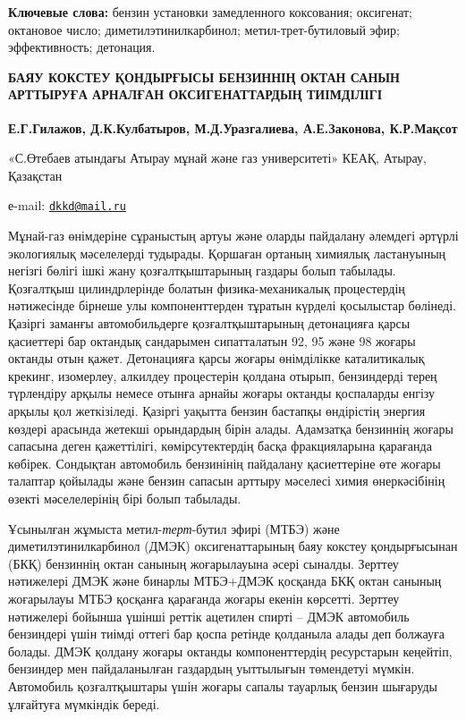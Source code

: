 {\bfseries Ключевые слова:} бензин установки замедленного коксования;
оксигенат; октановое число; диметилэтинилкарбинол; метил-трет-бутиловый
эфир; эффективность; детонация.

\begin{articleheader}
{\bfseries БАЯУ КОКСТЕУ ҚОНДЫРҒЫСЫ БЕНЗИННІҢ ОКТАН САНЫН АРТТЫРУҒА АРНАЛҒАН
ОКСИГЕНАТТАРДЫҢ ТИІМДІЛІГІ}

{\bfseries Е.Г.Гилажов, Д.К.Кулбатыров\textsuperscript{\envelope }, М.Д.Уразгалиева,
А.Е.Законова, К.Р.Мақсот}
\end{articleheader}

\begin{affiliation}
«С.Өтебаев атындағы Атырау мұнай және газ университеті» КЕАҚ, Атырау,
Қазақстан

е-mail: \href{mailto:dkkd@mail.ru}{\nolinkurl{dkkd@mail.ru}}
\end{affiliation}

Мұнай-газ өнімдеріне сұраныстың артуы және оларды пайдалану әлемдегі
әртүрлі экологиялық мәселелерді тудырады. Қоршаған ортаның химиялық
ластануының негізгі бөлігі ішкі жану қозғалтқыштарының газдары болып
табылады. Қозғалтқыш цилиндрлерінде болатын физика-механикалық
процестердің нәтижесінде бірнеше улы компоненттерден тұратын күрделі
қосылыстар бөлінеді. Қазіргі заманғы автомобильдерге қозғалтқыштарының
детонацияға қарсы қасиеттері бар октандық сандарымен сипатталатын 92, 95
және 98 жоғары октанды отын қажет. Детонацияға қарсы жоғары өнімділікке
каталитикалық крекинг, изомерлеу, алкилдеу процестерін қолдана отырып,
бензиндерді терең түрлендіру арқылы немесе отынға арнайы жоғары октанды
қоспаларды енгізу арқылы қол жеткізіледі. Қазіргі уақытта бензин
бастапқы өндірістің энергия көздері арасында жетекші орындардың бірін
алады. Адамзатқа бензиннің жоғары сапасына деген қажеттілігі,
көмірсутектердің басқа фракцияларына қарағанда көбірек. Сондықтан
автомобиль бензинінің пайдалану қасиеттеріне өте жоғары талаптар
қойылады және бензин сапасын арттыру мәселесі химия өнеркәсібінің өзекті
мәселелерінің бірі болып табылады.

Ұсынылған жұмыста метил-\emph{терт}-бутил эфирі (МТБЭ) және
диметилэтинилкарбинол (ДМЭК) оксигенаттарының баяу кокстеу қондырғысынан
(БКҚ) бензиннің октан санының жоғарылауына әсері сыналды. Зерттеу
нәтижелері ДМЭК және бинарлы МТБЭ+ДМЭК қосқанда БКҚ октан санының
жоғарылауы МТБЭ қосқанға қарағанда жоғары екенін көрсетті. Зерттеу
нәтижелері бойынша үшінші реттік ацетилен спирті -- ДМЭК автомобиль
бензиндері үшін тиімді оттегі бар қоспа ретінде қолданыла алады деп
болжауға болады. ДМЭК қолдану жоғары октанды компоненттердің ресурстарын
кеңейтіп, бензиндер мен пайдаланылған газдардың уыттылығын төмендетуі
мүмкін. Автомобиль қозғалтқыштары үшін жоғары сапалы тауарлық бензин
шығаруды ұлғайтуға мүмкіндік береді.


